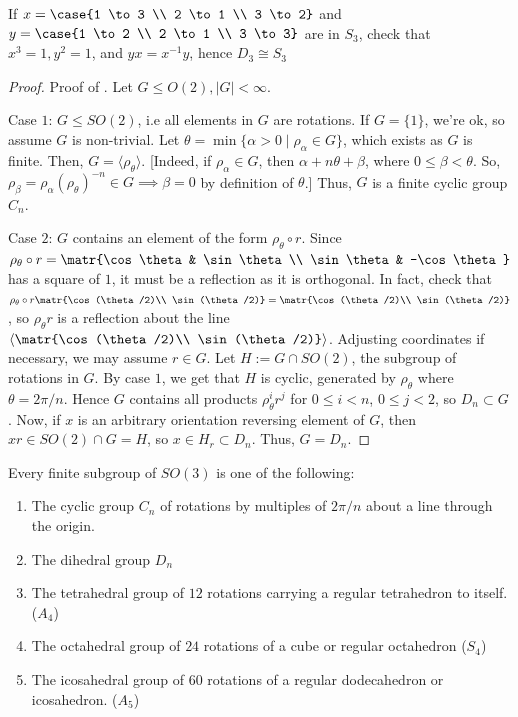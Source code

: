 \begin{notebox*}[Exercise]
    If $x=\case{1 \to 3 \\ 2 \to 1 \\ 3 \to 2}$ and $y = \case{1 \to 2 \\ 2 \to 1 \\ 3 \to 3}$ are in $S_3$, check that $x^3=1,y^2=1$, and $yx=x^{-1}y$, hence $D_3 \cong S_3$
\end{notebox*}

\begin{proof}
    Proof of . Let $G \leq O(2),|G| < \infty $.

    Case $1$: $G \leq SO(2)$, i.e all elements in $G$ are rotations. If $G = \{1\}$, we're ok, so assume $G$ is non-trivial. Let $\theta = \min \{\alpha >0 \mid \rho _\alpha \in G\}$, which exists as $G$ is finite. Then, $G = \langle \rho _\theta \rangle$. [Indeed, if $\rho _\alpha \in G$, then $\alpha + n \theta + \beta$, where $0 \leq \beta < \theta$. So, $\rho _\beta=\rho _\alpha (\rho _\theta)^{-n}\in G \implies \beta =0$ by definition of $\theta$.] Thus, $G$ is a finite cyclic group $C_n$.

    Case $2$: $G$ contains an element of the form $\rho _\theta \circ r$. Since $\rho _\theta \circ r=\matr{\cos \theta & \sin \theta \\ \sin \theta & -\cos \theta}$ has a square of $1$, it must be a reflection as it is orthogonal. In fact, check that $\rho _\theta \circ r \matr{\cos (\theta /2)\\ \sin (\theta /2)} =\matr{\cos (\theta /2)\\ \sin (\theta /2)}$, so $\rho _\theta r$ is a reflection about the line $\langle \matr{\cos (\theta /2)\\ \sin (\theta /2)} \rangle$. Adjusting coordinates if necessary, we may assume $r \in G$. Let $H:= G \cap SO(2)$, the subgroup of rotations in $G$. By case $1$, we get that $H$ is cyclic, generated by $\rho _\theta$ where $\theta = 2\pi /n$. Hence $G$ contains all products $\rho _\theta^ir^j$ for $0 \leq i < n$, $0 \leq j <2$, so $D_n \subset G$. Now, if $x$ is an arbitrary orientation reversing element of $G$, then $xr \in SO(2) \cap G = H$, so $x \in H_r \subset D_n$. Thus, $G=D_n$.
\end{proof}

\begin{thm}
    Every finite subgroup of $SO(3)$ is one of the following:
    \begin{enumerate}
        \item The cyclic group $C_n$ of rotations by multiples of $2\pi /n$ about a line through the origin.
        \item The dihedral group $D_n$
        \item The tetrahedral group of $12$ rotations carrying a regular tetrahedron to itself. ($A_4$)
        \item The octahedral group of $24$ rotations of a cube or regular octahedron ($S_4$)
        \item The icosahedral group of $60$ rotations of a regular dodecahedron or icosahedron. ($A_5$)
    \end{enumerate}
\end{thm}

